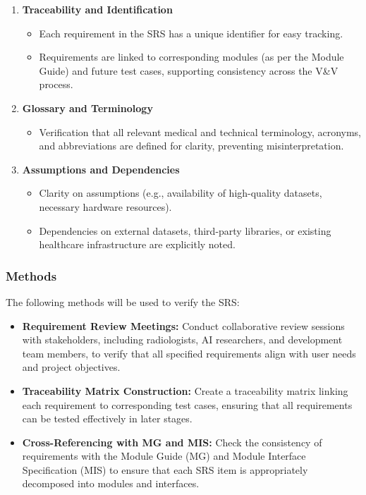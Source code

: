 \documentclass[12pt, titlepage]{article}
\begin{document}
\begin{enumerate}
\begin{itemize}
    \end{itemize}
  \item \textbf{Traceability and Identification}
    \begin{itemize}
      \item Each requirement in the SRS has a unique identifier for easy tracking.
      \item Requirements are linked to corresponding modules (as per the Module Guide) and future test cases, supporting consistency across the V\&V process.
    \end{itemize}
  \item \textbf{Glossary and Terminology}
    \begin{itemize}
      \item Verification that all relevant medical and technical terminology, acronyms, and abbreviations are defined for clarity, preventing misinterpretation.
    \end{itemize}
  \item \textbf{Assumptions and Dependencies}
    \begin{itemize}
      \item Clarity on assumptions (e.g., availability of high-quality datasets, necessary hardware resources).
      \item Dependencies on external datasets, third-party libraries, or existing healthcare infrastructure are explicitly noted.
    \end{itemize}
\end{enumerate}

\subsubsection{Methods}
The following methods will be used to verify the SRS:
\begin{itemize}
  \item \textbf{Requirement Review Meetings:} Conduct collaborative review sessions with stakeholders, including radiologists, AI researchers, and development team members, to verify that all specified requirements align with user needs and project objectives.
  \item \textbf{Traceability Matrix Construction:} Create a traceability matrix linking each requirement to corresponding test cases, ensuring that all requirements can be tested effectively in later stages.
  \item \textbf{Cross-Referencing with MG and MIS:} Check the consistency of requirements with the Module Guide (MG) and Module Interface Specification (MIS) to ensure that each SRS item is appropriately decomposed into modules and interfaces.
\end{itemize}
\end{document}
